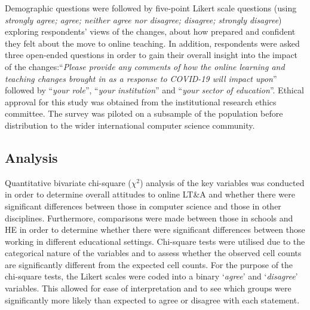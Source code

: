 \documentclass[conference]{IEEEtran}
\begin{document}
Demographic questions were followed by five-point Likert scale
questions (using {\emph{strongly agree; agree; neither agree nor disagree;
disagree; strongly disagree}}) exploring respondents' views of the
changes, about how prepared and confident they felt about the move to
online teaching. In addition, respondents were asked three open-ended
questions in order to gain their overall insight into the impact of
the changes:``{\emph{Please provide any comments of how the online
learning and teaching changes brought in as a response to COVID-19
will impact upon}}'' followed by ``{\emph{your role}}'', ``{\emph{your
institution}}'' and ``{\emph{your sector of education}}''. Ethical
approval for this study was obtained from the institutional research
ethics committee. The survey was piloted on a subsample of the
population before distribution to the wider international computer
science community.


\subsection{Analysis}


Quantitative bivariate chi-square ($\chi^2$) analysis of the key
variables was conducted in order to determine overall attitudes to
online LT\&A and whether there were significant differences between
those in computer science and those in other disciplines. Furthermore,
comparisons were made between those in schools and HE in order to
determine whether there were significant differences between those
working in different educational settings. Chi-square tests were
utilised due to the categorical nature of the variables and to assess
whether the observed cell counts are significantly different from the
expected cell counts. For the purpose of the chi-square tests, the
Likert scales were coded into a binary `{\emph{agree}}' and
`{\emph{disagree}}' variables. This allowed for ease of interpretation
and to see which groups were significantly more likely than expected
to agree or disagree with each statement.
\end{document}
